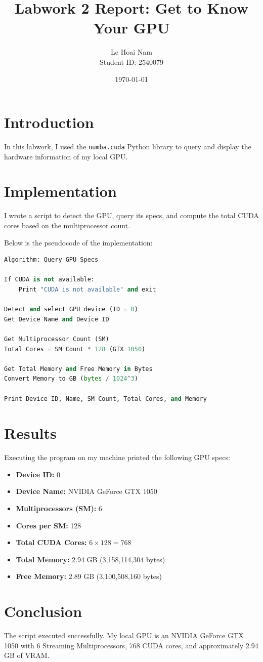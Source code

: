 \documentclass[12pt]{article}
\title{Labwork 2 Report: Get to Know Your GPU}
\author{Le Hoai Nam \\ Student ID: 2540079}
\date{\today}
\begin{document}
\maketitle

\section{Introduction}
In this labwork, I used the \texttt{numba.cuda} Python library to query and display the hardware information of my local GPU.

\section{Implementation}
I wrote a script to detect the GPU, query its specs, and compute the total CUDA cores based on the multiprocessor count.

Below is the pseudocode of the implementation:
\begin{lstlisting}[language=Python]
Algorithm: Query GPU Specs

If CUDA is not available:
    Print "CUDA is not available" and exit

Detect and select GPU device (ID = 0)
Get Device Name and Device ID

Get Multiprocessor Count (SM)
Total Cores = SM Count * 128 (GTX 1050)

Get Total Memory and Free Memory in Bytes
Convert Memory to GB (bytes / 1024^3)

Print Device ID, Name, SM Count, Total Cores, and Memory
\end{lstlisting}

\section{Results}
Executing the program on my machine printed the following GPU specs:

\begin{itemize}
    \item \textbf{Device ID:} 0
    \item \textbf{Device Name:} NVIDIA GeForce GTX 1050
    \item \textbf{Multiprocessors (SM):} 6
    \item \textbf{Cores per SM:} 128
    \item \textbf{Total CUDA Cores:} $6 \times 128 = 768$
    \item \textbf{Total Memory:} 2.94 GB (3,158,114,304 bytes)
    \item \textbf{Free Memory:} 2.89 GB (3,100,508,160 bytes)
\end{itemize}

\section{Conclusion}
The script executed successfully. My local GPU is an NVIDIA GeForce GTX 1050 with 6 Streaming Multiprocessors, 768 CUDA cores, and approximately 2.94 GB of VRAM.
\end{document}

